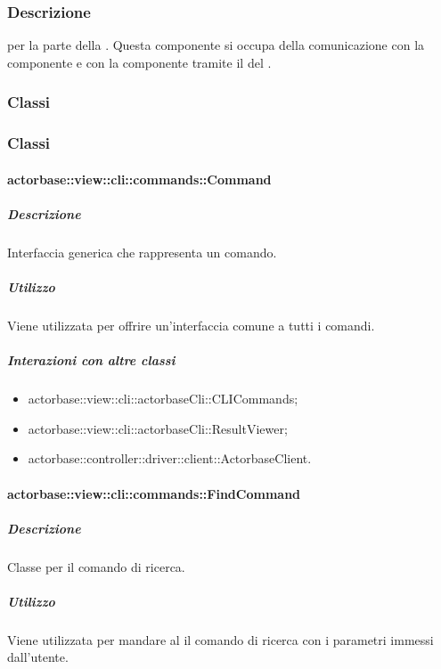 \documentclass{scalatekids-article}
\begin{document}
\subsubsection{Descrizione}

 per la parte  della . Questa componente
si occupa della comunicazione con la componente  e con la
componente  tramite il  del 
.

\subsubsection{Classi}

\subsubsection{Classi}

\paragraph{actorbase::view::cli::commands::Command}

\subparagraph{Descrizione}

Interfaccia generica che rappresenta un comando.

\subparagraph{Utilizzo}

Viene utilizzata per offrire un'interfaccia comune a tutti i comandi.

\subparagraph{Interazioni con altre classi}

\begin{itemize}
\item actorbase::view::cli::actorbaseCli::CLICommands;
\item actorbase::view::cli::actorbaseCli::ResultViewer;
\item actorbase::controller::driver::client::ActorbaseClient.
\end{itemize}

\paragraph{actorbase::view::cli::commands::FindCommand}

\subparagraph{Descrizione}

Classe per il comando di ricerca.

\subparagraph{Utilizzo}

Viene utilizzata per mandare al  il comando di ricerca con i
parametri immessi dall'utente.
\end{document}

